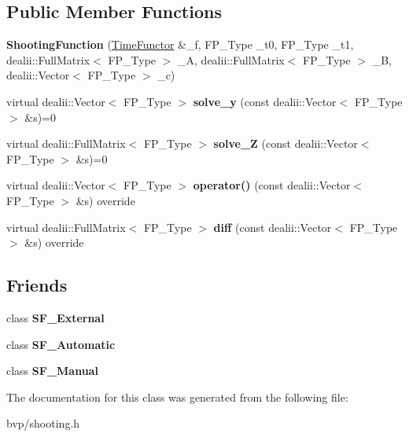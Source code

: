 \subsection*{Public Member Functions}
\begin{DoxyCompactItemize}
\item 
\mbox{\label{classShootingFunction_ae73f34f210d7f6836b570ecca21f62c0}} 
{\bfseries Shooting\+Function} (\hyperlink{classTimeFunctor}{Time\+Functor} \&\+\_\+f, F\+P\+\_\+\+Type \+\_\+t0, F\+P\+\_\+\+Type \+\_\+t1, dealii\+::\+Full\+Matrix$<$ F\+P\+\_\+\+Type $>$ \+\_\+A, dealii\+::\+Full\+Matrix$<$ F\+P\+\_\+\+Type $>$ \+\_\+B, dealii\+::\+Vector$<$ F\+P\+\_\+\+Type $>$ \+\_\+c)
\item 
\mbox{\label{classShootingFunction_ab708fd3b5eb520f4616f7237e4adb196}} 
virtual dealii\+::\+Vector$<$ F\+P\+\_\+\+Type $>$ {\bfseries solve\+\_\+y} (const dealii\+::\+Vector$<$ F\+P\+\_\+\+Type $>$ \&s)=0
\item 
\mbox{\label{classShootingFunction_a36381455eb853dda91b50f2d8381b664}} 
virtual dealii\+::\+Full\+Matrix$<$ F\+P\+\_\+\+Type $>$ {\bfseries solve\+\_\+Z} (const dealii\+::\+Vector$<$ F\+P\+\_\+\+Type $>$ \&s)=0
\item 
\mbox{\label{classShootingFunction_a02ef732410cfd2168a865e550610d1cf}} 
virtual dealii\+::\+Vector$<$ F\+P\+\_\+\+Type $>$ {\bfseries operator()} (const dealii\+::\+Vector$<$ F\+P\+\_\+\+Type $>$ \&s) override
\item 
\mbox{\label{classShootingFunction_ae848d8431d042e8f1df5bff5f716ed38}} 
virtual dealii\+::\+Full\+Matrix$<$ F\+P\+\_\+\+Type $>$ {\bfseries diff} (const dealii\+::\+Vector$<$ F\+P\+\_\+\+Type $>$ \&s) override
\end{DoxyCompactItemize}
\subsection*{Friends}
\begin{DoxyCompactItemize}
\item 
\mbox{\label{classShootingFunction_a93dbf39ac4cbbc98d7d42b86d98179eb}} 
class {\bfseries S\+F\+\_\+\+External}
\item 
\mbox{\label{classShootingFunction_ab9857bb910ee9206e4888bdc358f0ecb}} 
class {\bfseries S\+F\+\_\+\+Automatic}
\item 
\mbox{\label{classShootingFunction_acf7e9fe888f96c8f5b3243c0848c0fcd}} 
class {\bfseries S\+F\+\_\+\+Manual}
\end{DoxyCompactItemize}


The documentation for this class was generated from the following file\+:\begin{DoxyCompactItemize}
\item 
bvp/shooting.\+h\end{DoxyCompactItemize}
